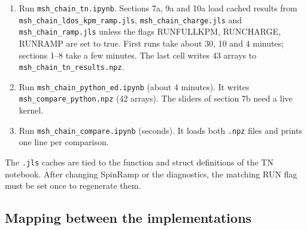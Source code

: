 \documentclass[11pt]{article}
\newcommand{\nb}[1]{\texttt{#1}}
\newcommand{\codeus}{\textunderscore\allowbreak}
\renewcommand{\code}[1]{{\ttfamily\let\_\codeus #1}}
\begin{document}
\begin{enumerate}
\item Run \nb{msh\_chain\_tn.ipynb}. Sections 7a, 9a and 10a load cached results from \nb{msh\_chain\_ldos\_kpm\_ramp.jls}, \nb{msh\_chain\_charge.jls} and \nb{msh\_chain\_ramp.jls} unless the flags \code{RUN\_FULL\_KPM}, \code{RUN\_CHARGE}, \code{RUN\_RAMP} are set to \code{true}. First runs take about 30, 10 and 4 minutes; sections 1–8 take a few minutes. The last cell writes 43 arrays to \nb{msh\_chain\_tn\_results.npz}.
\item Run \nb{msh\_chain\_python\_ed.ipynb} (about 4 minutes). It writes \nb{msh\_compare\_python.npz} (42 arrays). The sliders of section 7b need a live kernel.
\item Run \nb{msh\_chain\_compare.ipynb} (seconds). It loads both \nb{.npz} files and prints one line per comparison.
\end{enumerate}
The \nb{.jls} caches are tied to the function and struct definitions of the TN notebook. After changing \code{SpinRamp} or the diagnostics, the matching \code{RUN\_*} flag must be set once to regenerate them.

\subsection{Mapping between the implementations}
\label{sec:mapping}
\end{document}
